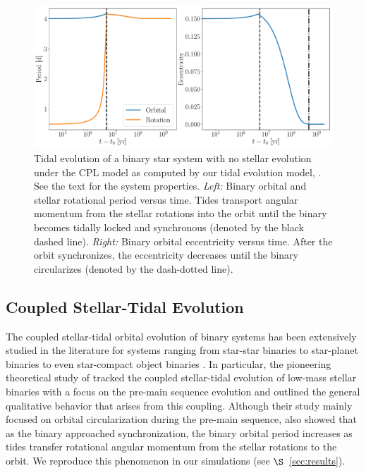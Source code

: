 \begin{figure}
	\includegraphics[width=\textwidth]{eqtide_example.pdf}
    \caption{Tidal evolution of a binary star system with no stellar evolution under the CPL model \citep{FerrazMello2008,Heller2011} as computed by our tidal evolution model, \eqtide.  See the text for the system properties. {\it Left:} Binary orbital and stellar rotational period versus time.  Tides transport angular momentum from the stellar rotations into the orbit until the binary becomes tidally locked and synchronous (denoted by the black dashed line).  {\it Right:} Binary orbital eccentricity versus time.  After the orbit synchronizes, the eccentricity decreases until the binary circularizes (denoted by the dash-dotted line).}
    \label{fig:eqtide_example}
\end{figure}


\subsection{Coupled Stellar-Tidal Evolution} \label{sec:coupled_evolution} 

The coupled stellar-tidal orbital evolution of binary systems has been extensively studied in the literature for systems ranging from star-star binaries \citep[e.g.][]{Huang1966,Mestel1968,VantVeer1988,Zahn1989,Li1998,Khaliullin2011} to star-planet binaries \cite[e.g.][]{DobbsDixon2004,Barker2009,Lanza2016} to even star-compact object binaries \citep[e.g.][]{Verbunt1981,Repetto2014}.  In particular, the pioneering theoretical study of \citet{Zahn1989} tracked the coupled stellar-tidal evolution of low-mass stellar binaries with a focus on the pre-main sequence evolution and outlined the general qualitative behavior that arises from this coupling.  Although their study mainly focused on orbital circularization during the pre-main sequence, \citet{Zahn1989} also showed that as the binary approached synchronization, the binary orbital period increases as tides transfer rotational angular momentum from the stellar rotations to the orbit.  We reproduce this phenomenon in our simulations (see $\S$~\ref{sec:results}).

